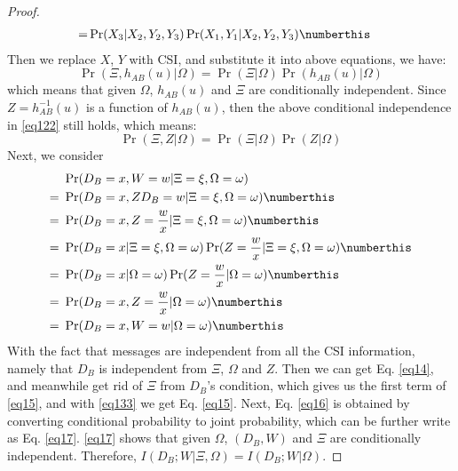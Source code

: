 \begin{proof}
\begin{subequations}
\begin{align*}
        =&\Pr(X_3|X_2,Y_2,Y_3)\Pr(X_1,Y_1|X_2,Y_2,Y_3) \numberthis \label{eq11}
    \end{align*}
\end{subequations}
Then we replace $X$, $Y$ with CSI, and substitute it into above equations, we have:
\begin{equation}
    \Pr(\Xi,h_{AB}(u)|\Omega)=\Pr(\Xi|\Omega)\Pr(h_{AB}(u)|\Omega)
    \label{eq122}
\end{equation}
which means that given $\Omega$, $h_{AB}(u)$ and $\Xi$ are conditionally independent. Since $Z=h_{AB}^{-1}(u)$ is a function of $h_{AB}(u)$, then the above conditional independence in \eqref{eq122} still holds, which means:
\begin{equation}
    \Pr(\Xi,Z|\Omega)=\Pr(\Xi|\Omega)\Pr(Z|\Omega)
    \label{eq133}
\end{equation}
Next, we consider
\begin{subequations}
    \begin{align*}
        &\Pr(D_B=x,W=w|\Xi=\xi,\Omega=\omega)\\
        =~ &\Pr(D_B=x,ZD_B=w|\Xi=\xi,\Omega=\omega) \numberthis \label{eq12}\\
        =~ &\Pr(D_B=x,Z=\frac{w}{x}|\Xi=\xi,\Omega=\omega) \numberthis \label{eq13}\\
        =~ &\Pr(D_B=x|\Xi=\xi,\Omega=\omega)\Pr(Z=\frac{w}{x}|\Xi=\xi,\Omega=\omega) \numberthis \label{eq14}\\
        =~ &\Pr(D_B=x|\Omega=\omega)\Pr(Z=\frac{w}{x}|\Omega=\omega) \numberthis \label{eq15}\\
        =~ &\Pr(D_B=x,Z=\frac{w}{x}|\Omega=\omega) \numberthis \label{eq16}\\
        =~ &\Pr(D_B=x,W=w|\Omega=\omega) \numberthis \label{eq17}
    \end{align*}
\end{subequations}
With the fact that messages are independent from all the CSI information, namely that $D_B$ is independent from $\Xi$, $\Omega$ and $Z$. Then we can get Eq. \eqref{eq14}, and meanwhile get rid of $\Xi$ from $D_B$'s condition, which gives us the first term of \eqref{eq15}, and with \eqref{eq133} we get Eq. \eqref{eq15}. Next, Eq. \eqref{eq16} is obtained by converting conditional probability to joint probability, which can be further write as Eq. \eqref{eq17}. \eqref{eq17} shows that given $\Omega$, $(D_B,W)$ and $\Xi$ are conditionally independent. Therefore, $I(D_B;W|\Xi,\Omega)=I(D_B;W|\Omega)$.


\end{proof}
